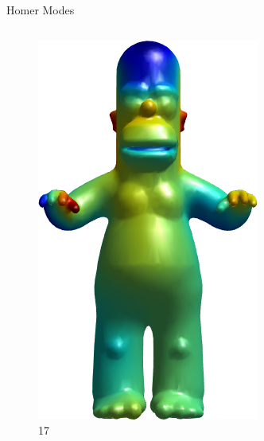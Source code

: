 \documentclass{beamer}
\begin{document}
\begin{frame}{Homer Modes}
\begin{columns}
\begin{column}[T]{3cm}
\begin{figure}[t]
    \includegraphics[width=\textwidth]{Harmonics/HomerModes/17.png}
    \caption*{\huge 17}
\end{figure}
\end{column}
\end{columns}

\end{frame}
\end{document}

